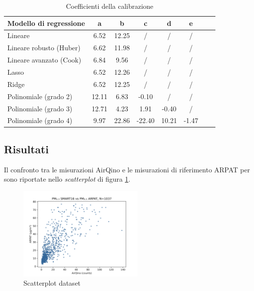 \begin{table}[H]
    \footnotesize
    \centering
    \begin{tabular}{|l|c|c|c|c|c|c|c|}
    \hline
        \textbf{Modello di regressione} & \textbf{a} & \textbf{b} & \textbf{c} & \textbf{d} & \textbf{e} \\ \hline
        Lineare & 6.52 & 12.25 & / & / & / \\ \hline
        Lineare robusto (Huber) & 6.62 & 11.98 & / & / & / \\ \hline
        Lineare avanzato (Cook) & 6.84 & 9.56 & / & / & / \\ \hline
        Lasso & 6.52 & 12.26 & / & / & / \\ \hline
        Ridge & 6.52 & 12.25 & / & / & / \\ \hline
        Polinomiale (grado 2) & 12.11 & 6.83 & -0.10 & / & / \\ \hline
        Polinomiale (grado 3) & 12.71 & 4.23 & 1.91 & -0.40 & / \\ \hline
        Polinomiale (grado 4) & 9.97 & 22.86 & -22.40 & 10.21 & -1.47 \\ \hline
    \end{tabular}
    \caption{Coefficienti della calibrazione }
    \label{fig:risultati-no2-coefficienti}
\end{table}

\subsection{Risultati }\label{ssec:risultati-pm2.5}

Il confronto tra le misurazioni AirQino e le misurazioni di riferimento ARPAT per  sono riportate nello \textit{scatterplot} di figura \ref{fig:scatterplot_pm2.5}.

\clearpage

\begin{figure}[H]
\centering
\includegraphics[width=0.55\textwidth,height=\textheight,keepaspectratio]{img/sc_pm2.5.png}
\caption{Scatterplot dataset }
\label{fig:scatterplot_pm2.5}
\end{figure}

